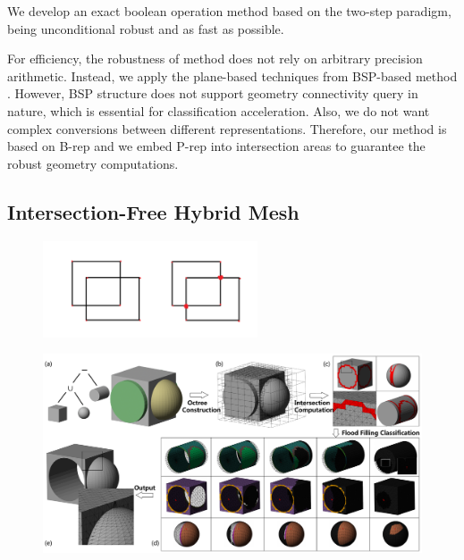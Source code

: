 \documentclass[10pt,journal,compsoc]{IEEEtran}
\begin{document}
We develop an exact boolean operation method based on the two-step paradigm, being unconditional robust and as fast as possible.

For efficiency, the robustness of method does not rely on arbitrary precision arithmetic. Instead, we apply the plane-based techniques from BSP-based method \cite{campen2010exact}. However, BSP structure does not support geometry connectivity query in nature, which is essential for classification acceleration. Also, we do not want complex conversions between different representations. Therefore, our method is based on B-rep and we embed P-rep into intersection areas to guarantee the robust geometry computations.


\iffalse
\subsection{Intersection-Free Hybrid Mesh}

\begin{figure}[t]
\centering
\includegraphics[width=2.5in]{linkedhalfedge}
\caption{{\color{red}{Sketch: The Linked Halfedge structure}}}
\label{fig:linkedhalfedge}
\end{figure}

\begin{figure}[!t]
\centering
\includegraphics[width=7.1in]{flowchart}
\caption{{\color{red}{Sketch: overview, will be replaced}}}
\label{fig:overview}
\end{figure}
\end{document}
